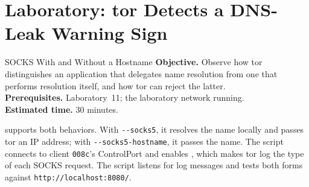 \section{Laboratory: tor Detects a DNS-Leak Warning Sign}\label{sec:lab-opsec}

\begin{laboratorio}[18]{SOCKS With and Without a Hostname}
\textbf{Objective.} Observe how tor distinguishes an application that delegates name resolution from one that performs resolution itself, and how tor can reject the latter.\\
\textbf{Prerequisites.} Laboratory~11; the laboratory network running.\\
\textbf{Estimated time.} 30 minutes.
\end{laboratorio}

 supports both behaviors. With \texttt{-{}-socks5}, it resolves the name locally and passes tor an IP address; with \texttt{-{}-socks5-hostname}, it passes the name. The  script connects to client \texttt{008c}'s ControlPort and enables , which makes tor log the type of each SOCKS request. The script listens for log messages and tests both forms against \texttt{http://localhost:8080/}.

